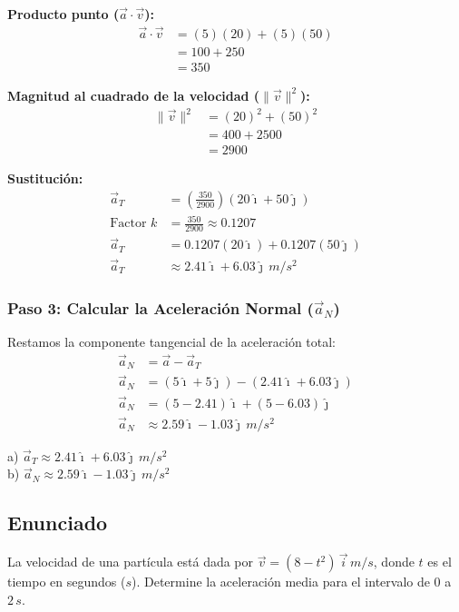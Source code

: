 \documentclass[12pt, a4paper]{article}
\begin{document}
\textbf{Producto punto ($\vec{a} \cdot \vec{v}$):}
\begin{align*}
\vec{a} \cdot \vec{v} &= (5)(20) + (5)(50) \\
&= 100 + 250 \\
&= 350
\end{align*}

\textbf{Magnitud al cuadrado de la velocidad ($\|\vec{v}\|^2$):}
\begin{align*}
\|\vec{v}\|^2 &= (20)^2 + (50)^2 \\
&= 400 + 2500 \\
&= 2900
\end{align*}

\textbf{Sustitución:}
\begin{align*}
\vec{a}_T &= \left( \frac{350}{2900} \right) (20\hat{\imath} + 50\hat{\jmath}) \\
\text{Factor } k &= \frac{350}{2900} \approx 0.1207 \\
\vec{a}_T &= 0.1207(20\hat{\imath}) + 0.1207(50\hat{\jmath}) \\
\vec{a}_T &\approx 2.41\hat{\imath} + 6.03\hat{\jmath} \, \si{m/s^2}
\end{align*}

\subsubsection*{Paso 3: Calcular la Aceleración Normal ($\vec{a}_N$)}
Restamos la componente tangencial de la aceleración total:
\begin{align*}
\vec{a}_N &= \vec{a} - \vec{a}_T \\
\vec{a}_N &= (5\hat{\imath} + 5\hat{\jmath}) - (2.41\hat{\imath} + 6.03\hat{\jmath}) \\
\vec{a}_N &= (5 - 2.41)\hat{\imath} + (5 - 6.03)\hat{\jmath} \\
\vec{a}_N &\approx 2.59\hat{\imath} - 1.03\hat{\jmath} \, \si{m/s^2}
\end{align*}

\begin{tcolorbox}[colback=blue!5!white, colframe=blue!75!black, title=Respuesta Final]
a) $\vec{a}_T \approx 2.41\hat{\imath} + 6.03\hat{\jmath} \, \si{m/s^2}$ \\
b) $\vec{a}_N \approx 2.59\hat{\imath} - 1.03\hat{\jmath} \, \si{m/s^2}$
\end{tcolorbox}

\newpage

\subsection*{Enunciado}
La velocidad de una partícula está dada por $\vec{v} = (8 - t^2) \, \vec{i} \, \si{m/s}$, donde $t$ es el tiempo en segundos ($\si{s}$). Determine la aceleración media para el intervalo de $0$ a $2 \, \si{s}$.
\end{document}
